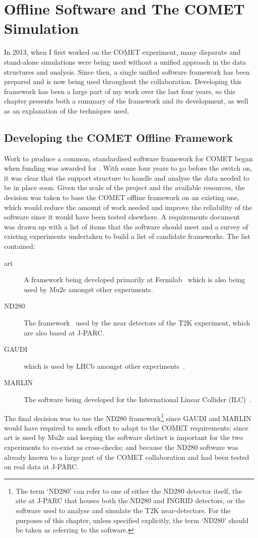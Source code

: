 
\chapter{Offline Software and The COMET Simulation}
In 2013, when I first worked on the COMET experiment, many disparate and stand-alone simulations were being used without a unified approach in the data structures and analysis.
Since then, a single unified software framework has been prepared and is now being used throughout the collaboration.
Developing this framework has been a large part of my work over the last four years, so this chapter presents both a summary of the framework and its development, as well as an explanation of the techniques used.

\section{Developing the COMET Offline Framework}
Work to produce a common, standardised software framework for COMET began when funding was awarded for \phaseI.
With some four years to go before the switch on, it was clear that the support structure to handle and analyse the data needed to be in place soon.
Given the scale of the project and the available resources, the decision was taken to base the COMET offline framework on an existing one, which would reduce the amount of work needed and improve the reliability of the software since it would have been tested elsewhere.
A requirements document~\cite{ID:requirements} was drawn up with a list of items that the software should meet and a survey of existing experiments undertaken to build a list of candidate frameworks.
The list contained:
\begin{description}
\item [art] A framework being developed primarily at Fermilab~\cite{art:2011} which is also being used by Mu2e amongst other experiments.
\item [ND280] The framework~\cite{T2K:nim} used by the near detectors of the T2K experiment, which are also based at J-PARC.
\item [GAUDI] which is used by LHCb amongst other experiments~\cite{gaudi:2001}.
\item [MARLIN] The software being developed for the International Linear Collider (ILC)~\cite{marlin:web}.
\end{description}

The final decision was to use the ND280 framework\footnote{The term `ND280' can
refer to one of either the ND280 detector itself, the site at J-PARC that
houses both the ND280 and INGRID detectors, or the software used to analyse and
simulate the T2K near-detectors.  For the purposes of this chapter, unless
specified explicitly, the term `ND280' should be taken as referring to the
software.} 
since GAUDI and MARLIN would have required to much effort to adapt to the COMET
requirements; since art is used by Mu2e and keeping the software distinct is
important for the two experiments to co-exist as cross-checks; and because the
ND280 software was already known to a large part of the COMET collaboration and
had been tested on real data at J-PARC.

